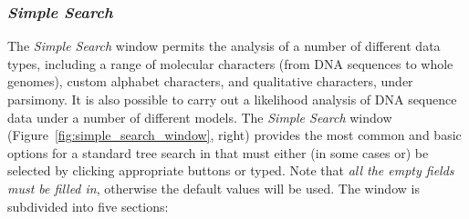 \subsubsection*{\emph{Simple Search}}
The \emph{Simple Search} window permits the analysis of a number of different data types, including a range of molecular characters (from DNA sequences to whole genomes), custom alphabet characters, and qualitative characters, under parsimony.  It is also possible to carry out a likelihood analysis of DNA sequence data under a number of different models.  
The \emph{Simple Search} window (Figure~\ref{fig:simple_search_window}, right) provides the most common and basic options for a standard tree search in \poy that must either (in some cases or) be selected by clicking appropriate buttons or typed. Note that \emph{all the empty fields must be filled in}, otherwise the default values will be used. The window is subdivided into five sections: 

